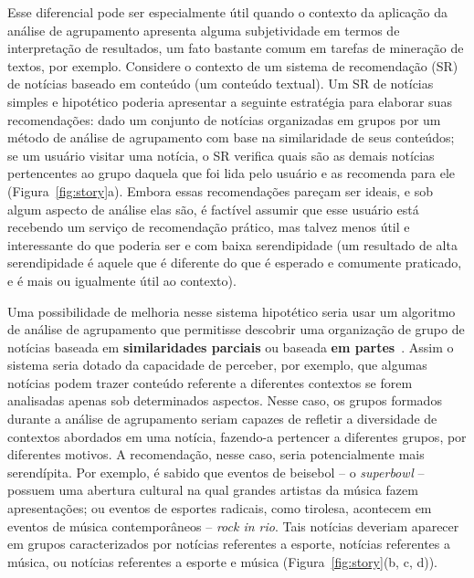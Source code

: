 \documentclass[
    12pt,                %
    oneside,            %
    a4paper,            %
    english,            %
    brazil                %
    ]{abntex2ppgsi}
\begin{document}
Esse diferencial pode ser especialmente útil quando o contexto da aplicação da análise de agrupamento apresenta alguma subjetividade em termos de interpretação de resultados, um fato bastante comum em tarefas de mineração de textos, por exemplo. Considere o contexto de um sistema de recomendação (SR) de notícias baseado em conteúdo (um conteúdo textual). Um SR de notícias simples e hipotético poderia apresentar a seguinte estratégia para elaborar suas recomendações: dado um conjunto de notícias organizadas em grupos por um método de análise de agrupamento com base na similaridade de seus conteúdos; se um usuário visitar uma notícia, o SR verifica quais são as demais notícias pertencentes ao grupo daquela que foi lida pelo usuário e as recomenda para ele (Figura~\ref{fig:story}a). Embora essas recomendações pareçam ser ideais, e sob algum aspecto de análise elas são, é factível assumir que esse usuário está recebendo um serviço de recomendação prático, mas talvez menos útil e interessante do que poderia ser e com baixa serendipidade (um resultado de alta serendipidade é aquele que é diferente do que é esperado e comumente praticado, e é mais ou igualmente útil ao contexto).

Uma possibilidade de melhoria nesse sistema hipotético seria usar um algoritmo de análise de agrupamento que permitisse descobrir uma organização de grupo de notícias baseada em \textbf{similaridades parciais} ou baseada \textbf{em partes}~\cite{Franca2010, Ho2008}. Assim o sistema seria dotado da capacidade de perceber, por exemplo, que algumas notícias podem trazer conteúdo referente a diferentes contextos se forem analisadas apenas sob determinados aspectos. Nesse caso, os grupos formados durante a análise de agrupamento seriam capazes de refletir a diversidade de contextos abordados em uma notícia, fazendo-a pertencer a diferentes grupos, por diferentes motivos. A recomendação, nesse caso, seria potencialmente mais serendípita. Por exemplo, é sabido que eventos de beisebol -- o \textit{superbowl} -- possuem uma abertura cultural na qual grandes artistas da música fazem apresentações; ou eventos de esportes radicais, como tirolesa, acontecem em eventos de música contemporâneos -- \textit{rock in rio}. Tais notícias deveriam aparecer em grupos caracterizados por notícias referentes a esporte, notícias referentes a música, ou notícias referentes a esporte e música (Figura~\ref{fig:story}(b, c, d)).
\end{document}

